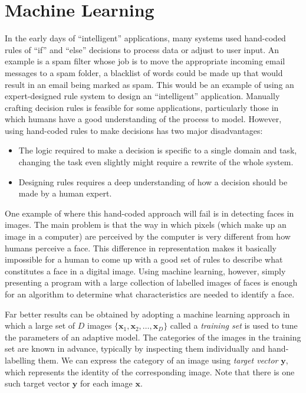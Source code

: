 \documentclass[12pt]{report}
\numberwithin{equation}{section}
\begin{document}
\section{Machine Learning}
In the early days of ``intelligent'' applications, many systems used hand-coded rules of ``if'' and ``else'' decisions to process data or adjust to user input. An example is a spam filter whose job is to move the appropriate incoming email messages to a spam folder, a blacklist of words could be made up that would result in an email being marked as spam. This would be an example of using an expert-designed rule system to design an ``intelligent'' application. Manually crafting decision rules is feasible for some applications, particularly those in which humans have a good understanding of the process to model. However, using hand-coded rules to make decisions has two major disadvantages:
\begin{itemize}
\item The logic required to make a decision is specific to a single domain and task, changing the task even slightly might require a rewrite of the whole system.
\item Designing rules requires a deep understanding of how a decision should be made
by a human expert.
\end{itemize}
One example of where this hand-coded approach will fail is in detecting faces in images. The main problem is that the way in which pixels (which make up an image in a computer) are perceived by the computer is very different from how humans perceive a face. This difference in representation makes it basically impossible for a human to come up with a good set of rules to describe what constitutes a face in a digital image. Using machine learning, however, simply presenting a program with a large collection of labelled images of faces is enough for an algorithm to determine what characteristics are needed to identify a face.

Far better results can be obtained by adopting a machine learning approach in which a large set of $D$ images $\{\bm{x}_1, \bm{x}_2, \hdots , \bm{x}_D\}$ called a \textit{training set} is used to tune the parameters of an adaptive model. The categories of the images in the training set are known in advance, typically by inspecting them individually and hand-labelling them. We can express the category of an image using \textit{target vector} $\bm{y}$, which represents the identity of the corresponding image. Note that there is one such target vector $\bm{y}$ for each  image $\bm{x}$.
\end{document}
